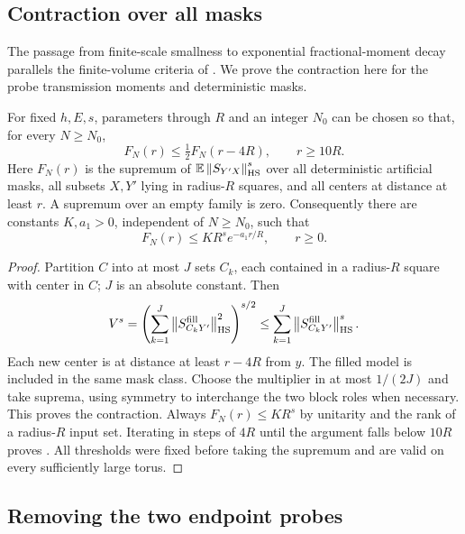 \subsection{Contraction over all masks}

The passage from finite-scale smallness to exponential fractional-moment
decay parallels the finite-volume criteria of
\cite{AizenmanSchenkerFriedrichHundertmark2001}. We prove the contraction
here for the probe transmission moments and deterministic masks.

\begin{proposition}\label{boot:contraction}
For fixed \(h,E,s\), parameters through \(R\) and an integer \(N_0\)
can be chosen so that, for every \(N\ge N_0\),
\[
 F_N(r)\le\tfrac12 F_N(r-4R),\qquad r\ge10R.
\]
Here \(F_N(r)\) is the supremum of
\(\mathbb E\left\lVert S_{Y'X}\right\rVert_{\rm HS}^s\) over all deterministic artificial
masks, all subsets \(X,Y'\) lying in radius-\(R\) squares, and all
centers at distance at least \(r\). A supremum over an empty family
is zero. Consequently there are constants \(K,a_1>0\), independent
of \(N\ge N_0\), such that
\begin{equation}\label{boot:mask-decay}
                 F_N(r)\le K R^s e^{-a_1 r/R},\qquad r\ge0.
\end{equation}
\end{proposition}

\begin{proof}
Partition \(C\) into at most \(J\) sets \(C_k\), each contained in a
radius-\(R\) square with center in \(C\); \(J\) is an absolute
constant. Then
\[
 V^s=\left(\sum_{k=1}^J
            \left\lVert S^{\rm fill}_{C_kY'}\right\rVert_{\rm HS}^2\right)^{s/2}
       \le\sum_{k=1}^J\left\lVert S^{\rm fill}_{C_kY'}\right\rVert_{\rm HS}^s.
\]
Each new center is at distance at least \(r-4R\) from \(y\).
The filled model is included in the same mask class. Choose the
multiplier in  at most \(1/(2J)\) and take
suprema, using symmetry to interchange the two block roles when
necessary. This proves the contraction. Always
\(F_N(r)\le K R^s\) by unitarity and the rank of a radius-\(R\) input
set. Iterating in steps of \(4R\) until the argument falls below
\(10R\) proves . All thresholds were fixed before
taking the supremum and are valid on every sufficiently large torus.
\end{proof}

\subsection{Removing the two endpoint probes}

